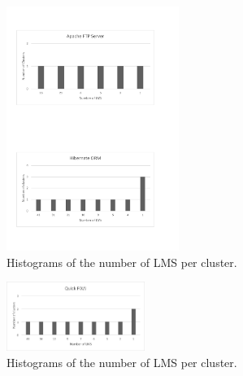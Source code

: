 \begin{figure} [H]
  \centering\includegraphics [width = 0.5\textwidth, height = 0.5\textheight]{Histograms/Histograms.pdf}
  \caption{Histograms of the number of LMS per cluster.}
  \label{fig:histograms}
\end{figure}

\begin{figure} [H]
  \centering\includegraphics [width = 0.4\textwidth, height = 0.15\textheight]{Histograms/QUICK.png}
  \caption{Histograms of the number of LMS per cluster.}
  \label{fig:histograms}
\end{figure}


\begin{equation}\label{reduction_eq}
\end{equation}

